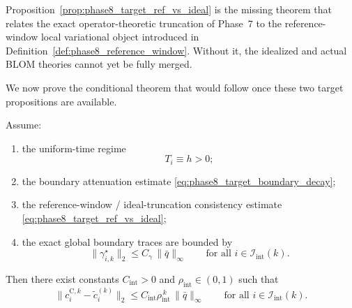 \begin{remark}
\label{rem:phase8_target_ref_vs_ideal_meaning}
Proposition~\ref{prop:phase8_target_ref_vs_ideal} is the missing theorem that relates the exact operator-theoretic truncation of Phase~7 to the reference-window local variational object introduced in Definition~\ref{def:phase8_reference_window}.
Without it, the idealized and actual BLOM theories cannot yet be fully merged.
\end{remark}

We now prove the conditional theorem that would follow once these two target propositions are available.

\begin{theorem}
\label{thm:phase8_conditional_uniform_matching}
Assume:
\begin{enumerate}
    \item the uniform-time regime
    \[
    T_i\equiv h>0;
    \]
    \item the boundary attenuation estimate \eqref{eq:phase8_target_boundary_decay};
    \item the reference-window / ideal-truncation consistency estimate \eqref{eq:phase8_target_ref_vs_ideal};
    \item the exact global boundary traces are bounded by
    \begin{equation}
    \label{eq:phase8_gamma_star_bound}
    \|\gamma_{i,k}^{\star}\|_2
    \le
    C_{\gamma}\,\|\bar q\|_\infty
    \qquad
    \text{for all } i\in\mathcal I_{\mathrm{int}}(k).
    \end{equation}
\end{enumerate}
Then there exist constants \(C_{\mathrm{int}}>0\) and \(\rho_{\mathrm{int}}\in(0,1)\) such that
\begin{equation}
\label{eq:phase8_conditional_uniform_matching}
\|c_i^{\mathrm{C},k}-\tilde c_i^{(k)}\|_2
\le
C_{\mathrm{int}}\rho_{\mathrm{int}}^{\,k}\,\|\bar q\|_\infty
\qquad
\text{for all } i\in\mathcal I_{\mathrm{int}}(k).
\end{equation}
\end{theorem}

